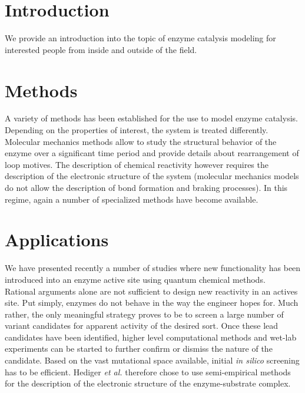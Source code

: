 \section{Introduction}\label{sec:intro}
We provide an introduction into the topic of enzyme catalysis modeling for interested people from inside and outside of the field.


\section{Methods}\label{sec:methods}
A variety of methods has been established for the use to model enzyme catalysis.
Depending on the properties of interest, the system is treated differently.
Molecular mechanics methods allow to study the structural behavior of the enzyme over a significant time period and provide details about rearrangement of loop motives.
The description of chemical reactivity however requires the description of the electronic structure of the system (molecular mechanics models do not allow the description of bond formation and braking processes).
In this regime, again a number of specialized methods have become available.


\section{Applications}\label{sec:apps}
We have presented recently a number of studies where new functionality has been introduced into an enzyme active site using quantum chemical methods\citep{10.1371/journal.pone.0049849,hediger2013silico,hediger2013computational}.\\
Rational arguments alone are not sufficient to design new reactivity in an actives site.
Put simply, enzymes do not behave in the way the engineer hopes for.
Much rather, the only meaningful strategy proves to be to screen a large number of variant candidates for apparent activity of the desired sort.
Once these lead candidates have been identified, higher level computational methods and wet-lab experiments can be started to further confirm or dismiss the nature of the candidate.
Based on the vast mutational space available, initial \textit{in silico} screening has to be efficient.
Hediger \textit{et al.} therefore chose to use semi-empirical methods for the description of the electronic structure of the enzyme-substrate complex.
